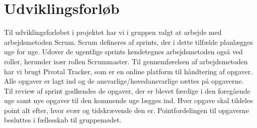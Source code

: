 \chapter{Udviklingsforløb}

Til udviklingsforløbet i projektet har vi i gruppen valgt at arbejde med arbejdsmetoden Scrum. Scrum defineres af sprints, der i dette tilfælde planlægges uge for uge. Udover de ugentlige sprints kendetegnes arbejdsmetoden også ved roller, herunder især rollen Scrummaster. Til gennemførelsen af arbejdsmetoden har vi brugt Pivotal Tracker, som er en online platform til håndtering af opgaver. Alle opgaver er lagt ind og de ansvarlige/hovedansvarlige sættes på opgaverne. Til review af sprint godkendes de opgaver, der er blevet færdige i den foregående uge samt nye opgaver til den kommende uge lægges ind. Hver opgave skal tildeles point alt efter, hvor svær og tidskrævende den er. Pointfordelingen til opgaverne besluttes i fællesskab til gruppemødet.
